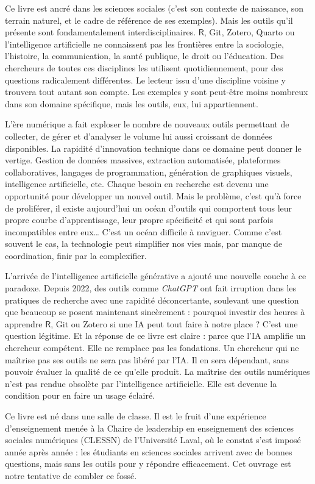 \documentclass[
  letterpaper,
  DIV=11,
  numbers=noendperiod,
  oneside]{scrreprt}
\begin{document}
Ce livre est ancré dans les sciences sociales (c'est son contexte de
naissance, son terrain naturel, et le cadre de référence de ses
exemples). Mais les outils qu'il présente sont fondamentalement
interdisciplinaires. \(\textsf{R}\), Git, Zotero, Quarto ou
l'intelligence artificielle ne connaissent pas les frontières entre la
sociologie, l'histoire, la communication, la santé publique, le droit ou
l'éducation. Des chercheurs de toutes ces disciplines les utilisent
quotidiennement, pour des questions radicalement différentes. Le lecteur
issu d'une discipline voisine y trouvera tout autant son compte. Les
exemples y sont peut-être moins nombreux dans son domaine spécifique,
mais les outils, eux, lui appartiennent.

L'ère numérique a fait exploser le nombre de nouveaux outils permettant
de collecter, de gérer et d'analyser le volume lui aussi croissant de
données disponibles. La rapidité d'innovation technique dans ce domaine
peut donner le vertige. Gestion de données massives, extraction
automatisée, plateformes collaboratives, langages de programmation,
génération de graphiques visuels, intelligence artificielle, etc. Chaque
besoin en recherche est devenu une opportunité pour développer un nouvel
outil. Mais le problème, c'est qu'à force de proliférer, il existe
aujourd'hui un océan d'outils qui comportent tous leur propre courbe
d'apprentissage, leur propre spécificité et qui sont parfois
incompatibles entre eux\ldots{} C'est un océan difficile à naviguer.
Comme c'est souvent le cas, la technologie peut simplifier nos vies
mais, par manque de coordination, finir par la complexifier.

L'arrivée de l'intelligence artificielle générative a ajouté une
nouvelle couche à ce paradoxe. Depuis 2022, des outils comme
\emph{ChatGPT} ont fait irruption dans les pratiques de recherche avec
une rapidité déconcertante, soulevant une question que beaucoup se
posent maintenant sincèrement : pourquoi investir des heures à apprendre
\(\textsf{R}\), Git ou Zotero si une IA peut tout faire à notre place ?
C'est une question légitime. Et la réponse de ce livre est claire :
parce que l'IA amplifie un chercheur compétent. Elle ne remplace pas les
fondations. Un chercheur qui ne maîtrise pas ses outils ne sera pas
libéré par l'IA. Il en sera dépendant, sans pouvoir évaluer la qualité
de ce qu'elle produit. La maîtrise des outils numériques n'est pas
rendue obsolète par l'intelligence artificielle. Elle est devenue la
condition pour en faire un usage éclairé.

Ce livre est né dans une salle de classe. Il est le fruit d'une
expérience d'enseignement menée à la Chaire de leadership en
enseignement des sciences sociales numériques (CLESSN) de l'Université
Laval, où le constat s'est imposé année après année : les étudiants en
sciences sociales arrivent avec de bonnes questions, mais sans les
outils pour y répondre efficacement. Cet ouvrage est notre tentative de
combler ce fossé.
\end{document}
